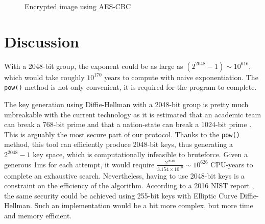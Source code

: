 \documentclass{article}
\begin{document}
\begin{figure}[h]
\begin{minipage}[t]{0.3\textwidth}
        \centering
        \caption{Encrypted image using AES-CBC}
        \label{fig:encrypted_image_cbc}
    \end{minipage}
\end{figure}

\section{Discussion}

With a 2048-bit group, the exponent could be as large as $(2^{2048}-1) \sim 10^{616}$, which would take roughly $10^{170}$ years to compute with naive exponentiation. The \verb+pow()+ method is not only convenient, it is required for the program to complete.

\bigskip

The key generation using Diffie-Hellman with a 2048-bit group is pretty much unbreakable with the current technology as it is estimated that an academic team can break a 768-bit prime and that a nation-state can break a 1024-bit prime \cite{weakdh15}. This is arguably the most secure part of our protocol. 
Thanks to the \verb+pow()+ method, this tool can efficiently produce 2048-bit keys, thus generating a $2^{2048}-1$ key space, which is computationally infeasible to bruteforce. Given a generous 1ms for each attempt, it would require $ \frac{2^{2048}}{3.154 \times 10^{10}} \sim 10^{626}$ CPU-years to complete an exhaustive search. 
Nevertheless, having to use 2048-bit keys is a constraint on the efficiency of the algorithm. According to a 2016 NIST report \cite{Barker2016}, the same security could be achieved using 255-bit keys with Elliptic Curve Diffie-Hellman. Such an implementation would be a bit more complex, but more time and memory efficient.
\end{document}

